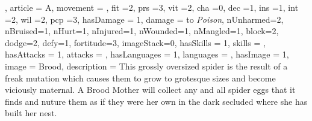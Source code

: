 {{, article = A, movement = , fit =2, prs =3, vit =2, cha =0, dec =1, ins =1, int =2, wil =2, pcp =3, hasDamage = 1, damage = to \textit{Poison}, nUnharmed=2, nBruised=1, nHurt=1, nInjured=1, nWounded=1, nMangled=1, block=2, dodge=2, defy=1, fortitude=3, imageStack=0, hasSkills = 1, skills = 
, hasAttacks = 1, attacks = 
, hasLanguages = 1, languages = , hasImage = 1, image = Brood, description = This grossly oversized spider is the result of a freak mutation which  causes them to grow to grotesque sizes and become viciously maternal. A Brood Mother will collect any and all spider eggs that it finds and nuture them as if they were her own in the dark\comma{} secluded where she has built her nest.}

}




